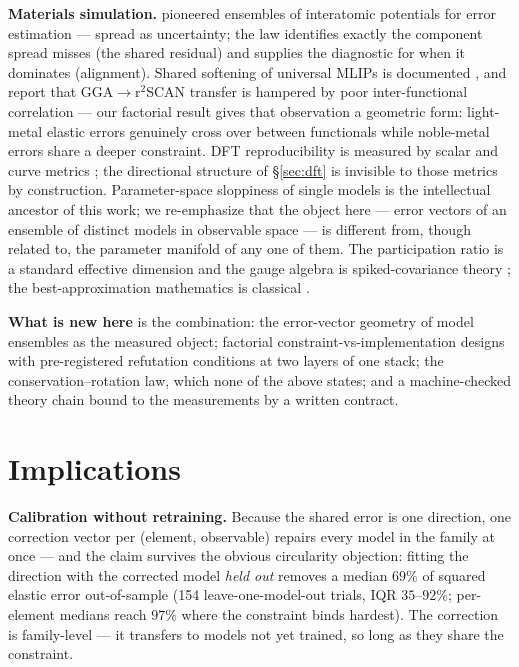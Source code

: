 \documentclass[11pt]{article}
\begin{document}
\textbf{Materials simulation.} \citet{frederiksen2004} pioneered ensembles of
interatomic potentials for error estimation --- spread as uncertainty; the law
identifies exactly the component spread misses (the shared residual) and
supplies the diagnostic for when it dominates (alignment). Shared softening of
universal MLIPs is documented \citep{deng2025softening,yu2024}, and
\citet{huang2025} report that GGA$\to$r$^2$SCAN transfer is hampered by poor
inter-functional correlation --- our factorial result gives that observation a
geometric form: light-metal elastic errors genuinely cross over between
functionals while noble-metal errors share a deeper constraint.
DFT reproducibility is measured by scalar and curve metrics
\citep{lejaeghere2016,bosoni2024}; the directional structure of
\S\ref{sec:dft} is invisible to those metrics by construction. Parameter-space
sloppiness of single models \citep{transtrum2011,machta2013,quinn2023,%
kurniawan2022} is the intellectual ancestor of this work; we re-emphasize that
the object here --- error vectors of an ensemble of distinct models in
observable space --- is different from, though related to, the parameter
manifold of any one of them. The participation ratio is a standard effective
dimension \citep{gao2015} and the gauge algebra is spiked-covariance theory
\citep{johnstone2001}; the best-approximation mathematics is classical
\citep{deutsch2001,kinderlehrer1980}.

\textbf{What is new here} is the combination: the error-vector geometry of
model ensembles as the measured object; factorial constraint-vs-implementation
designs with pre-registered refutation conditions at two layers of one stack;
the conservation--rotation law, which none of the above states; and a
machine-checked theory chain bound to the measurements by a written contract.

\section{Implications}
\label{sec:implications}

\textbf{Calibration without retraining.} Because the shared error is one
direction, one correction vector per (element, observable) repairs every model
in the family at once --- and the claim survives the obvious circularity
objection: fitting the direction with the corrected model \emph{held out}
removes a median $69\%$ of squared elastic error out-of-sample (154
leave-one-model-out trials, IQR $35$--$92\%$; per-element medians reach
$97\%$ where the constraint binds hardest). The correction is family-level
--- it transfers to models not yet trained, so long as they share the
constraint.
\end{document}
